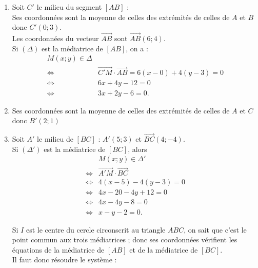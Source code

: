 \begin{enumerate}
	\item 	 Soit \(C'\) le milieu du segment \([AB]\) : \\
		 Ses coordonnées sont la moyenne de celles des extrémités de celles de $A$ et $B$ donc \(C'(0 ; 3)\).\\
		  Les coordonnées du vecteur \(\overrightarrow{AB}\) sont \(\overrightarrow{AB}(6 ; 4)\).\\
		   Si \((\Delta)\) est la médiatrice de \([AB]\), on a :		
	\begin{align*}
	M(x ; y) \in \Delta\\
	 \iff& \overrightarrow{C'M} \cdot \overrightarrow{AB} = 6(x - 0) + 4(y - 3) = 0 \\
	 \iff& 6x + 4y - 12 = 0\\
	  \iff& 3x + 2y - 6 = 0.
	\end{align*}
	
		
		
	\item  Ses coordonnées sont la moyenne de celles des extrémités de celles de $A$ et $C$  donc \(B'(2 ; 1)\)
		
		\item Soit \(A'\) le milieu de \([BC]\) :  \(A'(5 ; 3)\) et \(\overrightarrow{BC}(4 ; -4)\).\\
		 Si \((\Delta')\) est la médiatrice de \([BC]\), alors
	\begin{align*}
	&	M(x ; y) \in \Delta'\\
	 \iff &\overrightarrow{A'M} \cdot \overrightarrow{BC}\\
	  \iff& 4(x - 5) - 4(y - 3) = 0 \\
	  \iff& 4x - 20 - 4y + 12 = 0\\
	   \iff& 4x - 4y - 8 = 0 \\
	   \iff& x - y - 2 = 0.
\end{align*}
		
		Si \(I\) est le centre du cercle circonscrit au triangle \(ABC\), on sait que c'est le point commun aux trois médiatrices ; donc ses coordonnées vérifient les équations de la médiatrice de \([AB]\) et de la médiatrice de \([BC]\). \\
		Il faut donc résoudre le système :
		

\end{enumerate}
